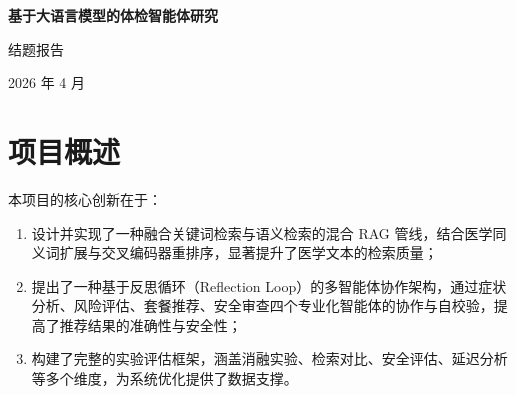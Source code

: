 \documentclass[12pt,a4paper]{article}
\begin{document}
\begin{center}
    \vspace*{1cm}
    {\LARGE\bfseries\color{darkblue} 基于大语言模型的体检智能体研究\par}
    \vspace{0.6em}
    {\Large\color{darkblue!70} 结题报告\par}
    \vspace{0.5em}
    {\large 2026 年 4 月\par}
\end{center}

\thispagestyle{fancy}

\begin{abstract}
\noindent
面对健康体检领域中普通用户缺乏专业医学知识、体检套餐选择困难的实际痛点，本项目设计并实现了一套面向个性化健康检查推荐的多智能体系统 HCR-by-AgentOS。系统在工程结构上采用四层分层架构：底层为基于 ChromaDB 向量数据库与 SQLite 关系数据库的混合数据存储层，其上为融合 BM25 倒排索引与 Dense 语义向量检索的混合检索层，再上为由协调器（CoordinatorAgent）统一调度的多智能体检推荐层，最上层为基于 Streamlit 的 Web 应用交互层。检索层内部通过查询分解器将用户复合查询拆分为症状、病史、人口统计、风险组合四个子维度，分别驱动 BM25 与 Dense 并行检索，经 RRF 融合排序后由交叉编码器精排输出 Top-K 证据。推荐层包含症状分析器、风险评估器、套餐推荐器与安全审查器四个专业化智能体，遵循推理—行动（Reason-Act）循环逐级处理证据，并在安全审查环节引入反思机制，对不合格推荐进行最多两轮的自动修订。系统底层复用了实验室自研的 AgentOS 智能体框架，该框架提供工具注册、记忆管理、提示词模板等基础能力，使各智能体模块可通过统一接口调用检索工具并维护对话状态。通过消融实验与多维度评估，验证了各工程模块对整体推荐质量的增量贡献，完整系统在推荐准确性、覆盖度、多样性及安全性等方面均优于基线配置。

\medskip
\noindent\textbf{关键词：} 大语言模型；多智能体；检索增强生成；健康检查推荐；AgentOS
\end{abstract}

\tableofcontents
\newpage

\section{项目概述}
\label{sec:overview}

本项目的核心创新在于：
\begin{enumerate}[leftmargin=2em]
    \item 设计并实现了一种融合关键词检索与语义检索的混合 RAG 管线，结合医学同义词扩展与交叉编码器重排序，显著提升了医学文本的检索质量；
    \item 提出了一种基于反思循环（Reflection Loop）的多智能体协作架构，通过症状分析、风险评估、套餐推荐、安全审查四个专业化智能体的协作与自校验，提高了推荐结果的准确性与安全性；
    \item 构建了完整的实验评估框架，涵盖消融实验、检索对比、安全评估、延迟分析等多个维度，为系统优化提供了数据支撑。
\end{enumerate}
\end{document}
